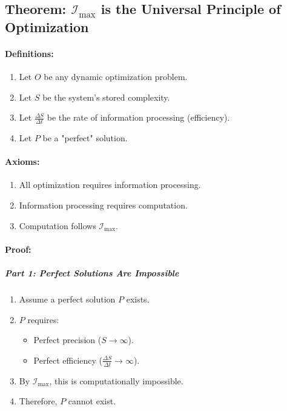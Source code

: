 \documentclass[12pt]{article}
\begin{document}
\subsection{Theorem: \(\mathcal{I}_{\text{max}}\) is the Universal Principle of Optimization}

\paragraph{Definitions:}
\begin{enumerate}
    \item Let \(O\) be any dynamic optimization problem.
    \item Let \(S\) be the system's stored complexity.
    \item Let \(\frac{\Delta S}{\Delta t}\) be the rate of information processing (efficiency).
    \item Let \(P\) be a "perfect" solution.
\end{enumerate}

\paragraph{Axioms:}
\begin{enumerate}
    \item All optimization requires information processing.
    \item Information processing requires computation.
    \item Computation follows \(\mathcal{I}_{\text{max}}\).
\end{enumerate}

\paragraph{Proof:}

\subparagraph{Part 1: Perfect Solutions Are Impossible}
\begin{enumerate}
    \item Assume a perfect solution \(P\) exists.
    \item \(P\) requires:
    \begin{itemize}
        \item Perfect precision (\(S \to \infty\)).
        \item Perfect efficiency (\(\frac{\Delta S}{\Delta t} \to \infty\)).
    \end{itemize}
    \item By \(\mathcal{I}_{\text{max}}\), this is computationally impossible.
    \item Therefore, \(P\) cannot exist.
\end{enumerate}
\end{document}
